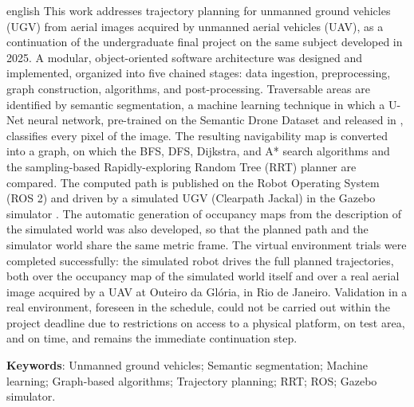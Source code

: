 \documentclass[
    12pt,
    openright,
    oneside,
    a4paper,
    english,
    brazil
]{abntex2}
\begin{document}
\begin{resumo}[Abstract]
\begin{otherlanguage*}{english}
This work addresses trajectory planning for unmanned ground vehicles (UGV) from aerial images acquired by unmanned aerial vehicles (UAV), as a continuation of the undergraduate final project on the same subject developed in 2025. A modular, object-oriented software architecture was designed and implemented, organized into five chained stages: data ingestion, preprocessing, graph construction, algorithms, and post-processing. Traversable areas are identified by semantic segmentation, a machine learning technique in which a U-Net neural network, pre-trained on the Semantic Drone Dataset \cite{drone_dataset} and released in \cite{junior2024_models}, classifies every pixel of the image. The resulting navigability map is converted into a graph, on which the BFS, DFS, Dijkstra, and A* search algorithms and the sampling-based Rapidly-exploring Random Tree (RRT) planner are compared. The computed path is published on the Robot Operating System (ROS 2) \cite{quigley2009} and driven by a simulated UGV (Clearpath Jackal) in the Gazebo simulator \cite{koenig2004}. The automatic generation of occupancy maps from the description of the simulated world was also developed, so that the planned path and the simulator world share the same metric frame. The virtual environment trials were completed successfully: the simulated robot drives the full planned trajectories, both over the occupancy map of the simulated world itself and over a real aerial image acquired by a UAV at Outeiro da Glória, in Rio de Janeiro. Validation in a real environment, foreseen in the schedule, could not be carried out within the project deadline due to restrictions on access to a physical platform, on test area, and on time, and remains the immediate continuation step.

\textbf{Keywords}: Unmanned ground vehicles; Semantic segmentation; Machine learning; Graph-based algorithms; Trajectory planning; RRT; ROS; Gazebo simulator.
\end{otherlanguage*}
\end{resumo}

\listoffigures*
\cleardoublepage

\listoftables*
\cleardoublepage
\end{document}
